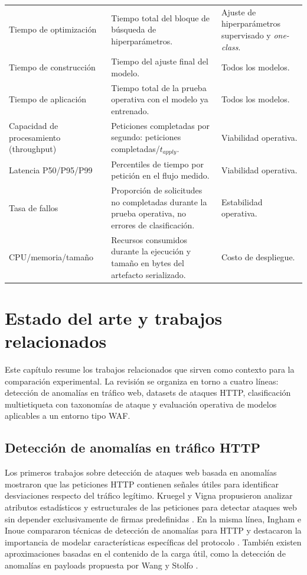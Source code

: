 \documentclass[12pt,oneside]{report}
\begin{document}
\begin{longtable}{@{}L{0.24\textwidth}L{0.43\textwidth}L{0.25\textwidth}@{}}
Tiempo de optimización & Tiempo total del bloque de búsqueda de hiperparámetros. & Ajuste de hiperparámetros supervisado y \textit{one-class}. \\
Tiempo de construcción & Tiempo del ajuste final del modelo.  & Todos los modelos. \\
Tiempo de aplicación & Tiempo total de la prueba operativa con el modelo ya entrenado. & Todos los modelos. \\
Capacidad de procesamiento (throughput) & Peticiones completadas por segundo: peticiones completadas/$t_{apply}$. & Viabilidad operativa. \\
Latencia P50/P95/P99 & Percentiles de tiempo por petición en el flujo medido. & Viabilidad operativa. \\
Tasa de fallos & Proporción de solicitudes no completadas durante la prueba operativa, no errores de clasificación. & Estabilidad operativa. \\
CPU/memoria/tamaño & Recursos consumidos durante la ejecución y tamaño en bytes del artefacto serializado. & Costo de despliegue. \\
\bottomrule
\end{longtable}




\chapter{Estado del arte y trabajos relacionados}

Este capítulo resume los trabajos relacionados que sirven como contexto para la comparación experimental. La revisión se organiza en torno a cuatro líneas: detección de anomalías en tráfico web, datasets de ataques HTTP, clasificación multietiqueta con taxonomías de ataque y evaluación operativa de modelos aplicables a un entorno tipo WAF.

\section{Detección de anomalías en tráfico HTTP}
Los primeros trabajos sobre detección de ataques web basada en anomalías mostraron que las peticiones HTTP contienen señales útiles para identificar desviaciones respecto del tráfico legítimo. Kruegel y Vigna propusieron analizar atributos estadísticos y estructurales de las peticiones para detectar ataques web sin depender exclusivamente de firmas predefinidas \cite{kruegel_vigna_2003}. En la misma línea, Ingham e Inoue compararon técnicas de detección de anomalías para HTTP y destacaron la importancia de modelar características específicas del protocolo \cite{ingham_inoue_2007}. También existen aproximaciones basadas en el contenido de la carga útil, como la detección de anomalías en payloads propuesta por Wang y Stolfo \cite{wang_stolfo_2004}.
\end{document}
